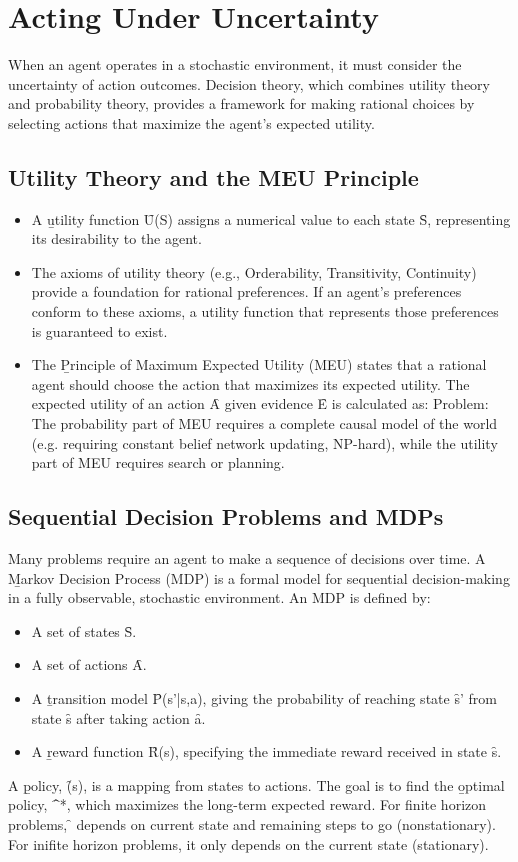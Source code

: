 \section{Acting Under Uncertainty}
When an agent operates in a stochastic environment, it must consider the uncertainty of action outcomes. Decision theory, which combines utility theory and probability theory, provides a framework for making rational choices by selecting actions that maximize the agent's expected utility.

\subsection{Utility Theory and the MEU Principle}
\begin{itemize}
    \item A \b{utility function} \f{U(S)} assigns a numerical value to each state \f{S}, representing its desirability to the agent.
    \item The axioms of utility theory (e.g., Orderability, Transitivity, Continuity) provide a foundation for rational preferences. If an agent's preferences conform to these axioms, a utility function that represents those preferences is guaranteed to exist.
    \item The \b{Principle of Maximum Expected Utility (MEU)} states that a rational agent should choose the action that maximizes its expected utility. The expected utility of an action \f{A} given evidence \f{E} is calculated as:
    Problem: The probability part of MEU requires a complete causal model of the world (e.g. requiring constant belief network updating, NP-hard), while the utility part of MEU requires search or planning.
\end{itemize}

\subsection{Sequential Decision Problems and MDPs}
Many problems require an agent to make a sequence of decisions over time. A \b{Markov Decision Process (MDP)} is a formal model for sequential decision-making in a fully observable, stochastic environment. An MDP is defined by:
\begin{itemize}
    \item A set of states \f{S}.
    \item A set of actions \f{A}.
    \item A \b{transition model} \f{P(s'|s,a)}, giving the probability of reaching state \f{s'} from state \f{s} after taking action \f{a}.
    \item A \b{reward function} \f{R(s)}, specifying the immediate reward received in state \f{s}.
\end{itemize}
A \b{policy}, \f{\pi(s)}, is a mapping from states to actions. The goal is to find the \b{optimal policy}, \f{\pi^*}, which maximizes the long-term expected reward. For finite horizon problems, \f{\pi*} depends on current state and remaining steps to go (nonstationary). For inifite horizon problems, it only depends on the current state (stationary).

